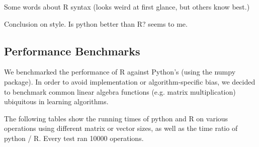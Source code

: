\documentclass[%
        final,
        notitlepage,
        narroweqnarray,
        inline,
        ]{ieee}
\begin{document}
Some words about R syntax (looks weird at first glance, but others know best.)

Conclusion on style. Is python better than R? seems to me.

\subsection{Performance Benchmarks}

We benchmarked the performance of R against Python's (using the numpy package).
In order to avoid implementation or algorithm-specific bias, we decided to
benchmark common linear algebra functions (e.g. matrix multiplication)
ubiquitous in learning algorithms.

The following tables show the running times of python and R on various
operations using different matrix or vector sizes, as well as the time ratio of
python / R. Every test ran 10000 operations.
\end{document}
